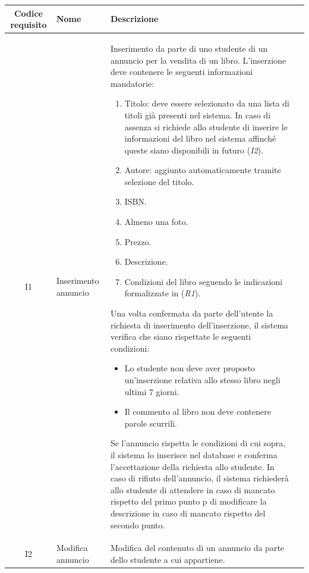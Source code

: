 \documentclass[10pt,a4paper]{report}
\begin{document}
	\begin{tabular}{cp{3cm}p{9cm}p{1cm}}
		Codice requisito&Nome&Descrizione\\ \hline
		I1&Inserimento annuncio&Inserimento da parte di uno studente di un annuncio per la vendita di un libro. L'inserzione deve contenere le seguenti informazioni mandatorie:
		\begin{enumerate}
			\item Titolo: deve essere selezionato da una lista di titoli già presenti nel sistema. In caso di assenza si richiede allo studente di inserire le informazioni del libro nel sistema affinché queste siano disponibili in futuro (\textit{I2}).
			\item Autore: aggiunto automaticamente tramite selezione del titolo.
			\item ISBN.
			\item Almeno una foto.
			\item Prezzo.
			\item Descrizione.	
			\item Condizioni del libro seguendo le indicazioni formalizzate in (\textit{R1}).
		\end{enumerate}
		Una volta confermata da parte dell'utente la richiesta di inserimento dell'inserzione, il sistema verifica che siano rispettate le seguenti condizioni:
		\begin{itemize}
			\item Lo studente non deve aver proposto un'inserzione relativa allo stesso libro negli ultimi 7 giorni.
			\item Il commento al libro non deve contenere parole scurrili.
		\end{itemize}
		Se l'annuncio rispetta le condizioni di cui sopra, il sistema lo inserisce nel database e conferma l'accettazione della richiesta allo studente. In caso di rifiuto dell'annuncio, il sistema richiederà allo studente di attendere in caso di mancato rispetto del primo punto p di modificare la descrizione in caso di mancato rispetto del secondo punto.\\ \hline
		I2&Modifica annuncio&Modifica del contenuto di un annuncio da parte dello studente a cui appartiene.\\ \hline
	\end{tabular}
	\newpage
\end{document}
